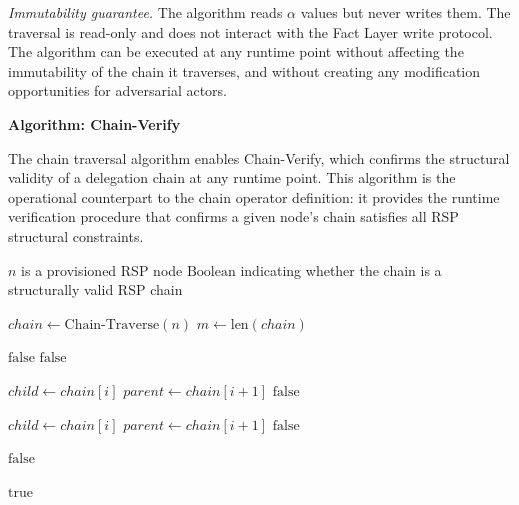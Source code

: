 \textit{Immutability guarantee.} The algorithm reads $\alpha$ values but never writes them. The traversal is read-only and does not interact with the Fact Layer write protocol. The algorithm can be executed at any runtime point without affecting the immutability of the chain it traverses, and without creating any modification opportunities for adversarial actors.

\bigskip
\noindent\textbf{Algorithm: Chain-Verify}

The chain traversal algorithm enables Chain-Verify, which confirms the structural validity of a delegation chain at any runtime point. This algorithm is the operational counterpart to the chain operator definition: it provides the runtime verification procedure that confirms a given node's chain satisfies all RSP structural constraints.

\begin{algorithm}
\caption{Chain-Verify($n$) --- Verify the authorization chain from node $n$ to human anchor}
\label{alg:chain-verify}
\begin{algorithmic}[1]
\REQUIRE $n$ is a provisioned RSP node
\ENSURE $\text{Boolean}$ indicating whether the chain is a structurally valid RSP chain

\STATE $chain \leftarrow \text{Chain-Traverse}(n)$
\STATE $m \leftarrow \text{len}(chain)$

\STATE {}
    \STATE \RETURN $\text{false}$ 
\ENDIF
{}
    \STATE \RETURN $\text{false}$ 
\ENDIF

\STATE {}
    \STATE $child \leftarrow chain[i]$
    \STATE $parent \leftarrow chain[i+1]$
        \STATE \RETURN $\text{false}$ 
    \ENDIF
\ENDFOR

\STATE {}
    \STATE $child \leftarrow chain[i]$
    \STATE $parent \leftarrow chain[i+1]$
        \STATE \RETURN $\text{false}$ 
    \ENDIF
\ENDFOR

\STATE {}
        \STATE \RETURN $\text{false}$ 
    \ENDIF
\ENDFOR

\RETURN $\text{true}$
\end{algorithmic}
\end{algorithm}

